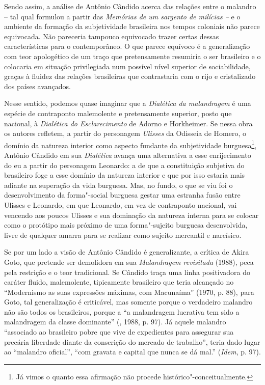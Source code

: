 {Sendo assim, a análise de Antônio Cândido acerca das relações entre o
malandro -- tal qual formulou a partir das \emph{Memórias de um sargento
de milícias --} e o ambiente da formação da subjetividade brasileira nos
tempos coloniais não parece equivocada. Não pareceria tampouco
equivocado trazer certas dessas características para o contemporâneo. O
que parece equívoco é a generalização com teor apologético de um traço
que pretensamente resumiria o ser brasileiro e o colocaria em situação
privilegiada num possível nível superior de sociabilidade, graças à
fluidez das relações brasileiras que contrastaria com o rijo e
cristalizado dos países avançados.

Nesse sentido, podemos quase imaginar que a \emph{Dialética da
malandragem} é uma espécie de contraponto malemolente e pretensamente
superior, posto que nacional, à \emph{Dialética do Esclarecimento} de
Adorno e Horkheimer. Se nessa obra os autores refletem, a partir do
personagem \emph{Ulisses} da Odisseia de Homero, o domínio da natureza
interior como aspecto fundante da subjetividade burguesa\footnote{Já vimos
o quanto essa afirmação não procede histórico"-conceitualmente.}, Antônio
Cândido em sua \emph{Dialética} avança uma alternativa a esse
enrijecimento do eu a partir do personagem Leonardo: a de que a
constituição subjetiva do brasileiro foge a esse domínio da natureza
interior e que por isso estaria mais adiante na superação da vida
burguesa. Mas, no fundo, o que se viu foi o desenvolvimento da
forma"-social burguesa gestar uma estranha fusão entre Ulisses e
Leonardo, em que Leonardo, em vez de contraponto nacional, vai vencendo
aos poucos Ulisses e sua dominação da natureza interna para se colocar
como o protótipo mais próximo de uma forma"-sujeito burguesa
desenvolvida, livre de qualquer amarra para se realizar como sujeito
mercantil e narcísico.

Se por um lado a visão de Antônio Cândido é generalizante, a crítica de
Akira Goto, que pretende ser demolidora em sua \emph{Malandragem
revisitada} (1988), peca pela restrição e o teor tradicional. Se Cândido
traça uma linha positivadora do caráter fluido, malemolente, tipicamente
brasileiro que teria alcançado no ``Modernismo as suas expressões
máximas, com Macunaíma'' (1970, p. 88), para Goto, tal generalização é
criticável, mas somente porque o verdadeiro malandro não são todos os
brasileiros, porque a ``a malandragem lucrativa tem sido a malandragem
da classe dominante'' (, 1988, p. 97). Já aquele malandro
``associado ao brasileiro pobre que vive de expedientes para assegurar
sua precária liberdade diante da conscrição do mercado de trabalho'',
teria dado lugar ao ``malandro oficial'', ``com gravata e capital que
nunca se dá mal.'' (\emph{Idem}, p. 97).

}
